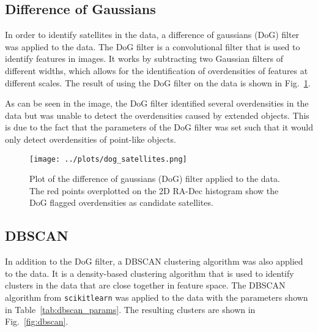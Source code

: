 \documentclass[11pt,a4paper]{article}
\begin{document}
\subsection{Difference of Gaussians}
\label{sec:dog}
In order to identify satellites in the data, a difference of gaussians (DoG) filter was applied to the data. The DoG filter is a convolutional filter that is used to identify features in images. It works by subtracting two Gaussian filters of different widths, which allows for the identification of overdensities of features at different scales. The result of using the DoG filter on the data is shown in Fig.~\ref{fig:dog}.

As can be seen in the image, the DoG filter identified several overdensities in the data but was unable to detect the overdensities caused by extended objects. This is due to the fact that the parameters of the DoG filter was set such that it would only detect overdensities of point-like objects.

\begin{figure}[h]
    \centering
    \texttt{[image: ../plots/dog\_satellites.png]}
    \caption{Plot of the difference of gaussians (DoG) filter applied to the data. The red points overplotted on the 2D RA-Dec histogram show the DoG flagged overdensities as candidate satellites.}
    \label{fig:dog}
\end{figure}
\clearpage
\subsection{DBSCAN}
\label{sec:dbscan}
In addition to the DoG filter, a DBSCAN clustering algorithm was also applied to the data. It is a density-based clustering algorithm that is used to identify clusters in the data that are close together in feature space. The DBSCAN algorithm from \texttt{scikit\-learn} \citep{scikit-learn} was applied to the data with the parameters shown in Table~\ref{tab:dbscan_params}. The resulting clusters are shown in Fig.~\ref{fig:dbscan}.
\end{document}
